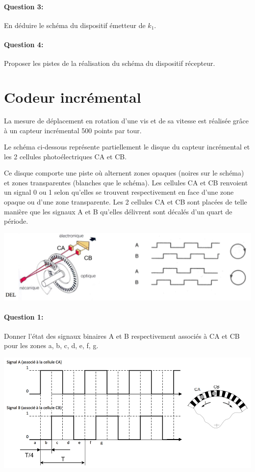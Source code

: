 \paragraph{Question 3:} En déduire le schéma du dispositif émetteur de $k_1$.

\paragraph{Question 4:} Proposer les pistes de la réalisation du schéma du dispositif récepteur.

\section{Codeur incrémental}

La mesure de déplacement en rotation d'une vis et de sa vitesse est réalisée grâce à un capteur incrémental 500 points par tour.

Le schéma ci-dessous représente partiellement le disque du capteur incrémental et les 2 cellules photoélectriques CA et CB.

Ce disque comporte une piste où alternent zones opaques (noires sur le schéma) et zones transparentes (blanches que le schéma). Les cellules CA et CB renvoient un signal 0 ou 1 selon qu'elles se trouvent respectivement en face d'une zone opaque ou d'une zone transparente. Les 2 cellules CA et CB sont placées de telle manière que les signaux A et B qu'elles délivrent sont décalés d'un quart de période.

\begin{center}
 \includegraphics[width=0.7\linewidth]{img/figure01}
\end{center}

\paragraph{Question 1:} Donner l'état des signaux binaires A et B respectivement associés à CA et CB pour les zones a, b, c, d, e, f, g.

\begin{center}
 \includegraphics[width=0.7\linewidth]{img/figure02}
\end{center}

